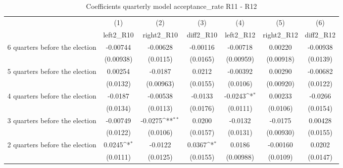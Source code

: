 \begin{table}[htbp]\centering
\def\sym#1{\ifmmode^{#1}\else\(^{#1}\)\fi}
\caption{Coefficients quarterly model acceptance\_rate R11 - R12}
\begin{tabular}{l*{6}{c}}
\hline\hline
                    &\multicolumn{1}{c}{(1)}&\multicolumn{1}{c}{(2)}&\multicolumn{1}{c}{(3)}&\multicolumn{1}{c}{(4)}&\multicolumn{1}{c}{(5)}&\multicolumn{1}{c}{(6)}\\
                    &\multicolumn{1}{c}{left2\_R10}&\multicolumn{1}{c}{right2\_R10}&\multicolumn{1}{c}{diff2\_R10}&\multicolumn{1}{c}{left2\_R12}&\multicolumn{1}{c}{right2\_R12}&\multicolumn{1}{c}{diff2\_R12}\\
\hline
 6 quarters before the election&    -0.00744         &    -0.00628         &    -0.00116         &    -0.00718         &     0.00220         &    -0.00938         \\
                    &   (0.00938)         &    (0.0115)         &    (0.0165)         &   (0.00959)         &   (0.00918)         &    (0.0139)         \\
[1em]
 5 quarters before the election&     0.00254         &     -0.0187         &      0.0212         &    -0.00392         &     0.00290         &    -0.00682         \\
                    &    (0.0132)         &   (0.00963)         &    (0.0155)         &    (0.0106)         &   (0.00920)         &    (0.0122)         \\
[1em]
 4 quarters before the election&     -0.0187         &    -0.00538         &     -0.0133         &     -0.0243\sym{*}  &     0.00233         &     -0.0266         \\
                    &    (0.0134)         &    (0.0113)         &    (0.0176)         &    (0.0111)         &    (0.0106)         &    (0.0154)         \\
[1em]
 3 quarters before the election&    -0.00749         &     -0.0275\sym{**} &      0.0200         &     -0.0132         &     -0.0175         &     0.00428         \\
                    &    (0.0122)         &    (0.0106)         &    (0.0157)         &    (0.0131)         &   (0.00930)         &    (0.0155)         \\
[1em]
 2 quarters before the election&      0.0245\sym{*}  &     -0.0122         &      0.0367\sym{*}  &      0.0186         &    -0.00160         &      0.0202         \\
                    &    (0.0111)         &    (0.0125)         &    (0.0155)         &   (0.00988)         &    (0.0109)         &    (0.0147)         \\

\end{tabular}
\end{table}
